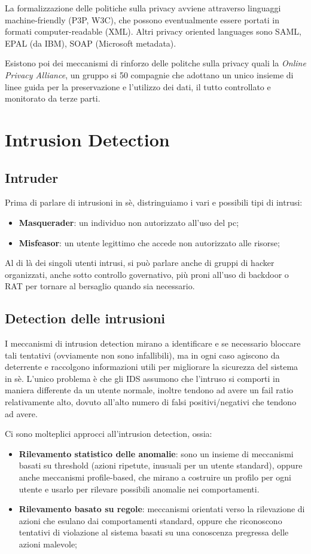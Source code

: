 \documentclass[a4paper, 10pt, twoside]{article}
\begin{document}
	La formalizzazione delle politiche sulla privacy avviene attraverso linguaggi machine-friendly (P3P, W3C), che possono eventualmente essere portati in formati computer-readable (XML).
	Altri privacy oriented languages sono SAML, EPAL (da IBM), SOAP (Microsoft metadata).

	Esistono poi dei meccanismi di rinforzo delle politche sulla privacy quali la \textit{Online Privacy Alliance}, un gruppo si 50 compagnie che adottano un unico insieme di linee guida per la preservazione e l'utilizzo dei dati, il tutto controllato e monitorato da terze parti.

	\section{Intrusion Detection}
	\subsection{Intruder}
	Prima di parlare di intrusioni in sè, distringuiamo i vari e possibili tipi di intrusi: \begin{itemize}
		\item \textbf{Masquerader}: un individuo non autorizzato all'uso del pc;
		\item \textbf{Misfeasor}: un utente legittimo che accede non autorizzato alle risorse;
	\end{itemize}

	Al di là dei singoli utenti intrusi, si può parlare anche di gruppi di hacker organizzati, anche sotto controllo governativo, più proni all'uso di backdoor o RAT per tornare al bersaglio quando sia necessario.
	
	\subsection{Detection delle intrusioni}
	I meccanismi di intrusion detection mirano a identificare e se necessario bloccare tali tentativi (ovviamente non sono infallibili), ma in ogni caso agiscono da deterrente e raccolgono informazioni utili per migliorare la sicurezza del sistema in sè. L'unico problema è che gli IDS assumono che l'intruso si comporti in maniera differente da un utente normale, inoltre tendono ad avere un fail ratio relativamente alto, dovuto all'alto numero di falsi positivi/negativi che tendono ad avere.

	Ci sono molteplici approcci all'intrusion detection, ossia: \begin{itemize}
		\item \textbf{Rilevamento statistico delle anomalie}: sono un insieme di meccanismi basati su threshold (azioni ripetute, inusuali per un utente standard), oppure anche meccanismi profile-based, che mirano a costruire un profilo per ogni utente e usarlo per rilevare possibili anomalie nei comportamenti. 
		\item \textbf{Rilevamento basato su regole}: meccanismi orientati verso la rilevazione di azioni che esulano dai comportamenti standard, oppure che riconoscono tentativi di violazione al sistema basati su una conoscenza pregressa delle azioni malevole;
	\end{itemize}
\end{document}
